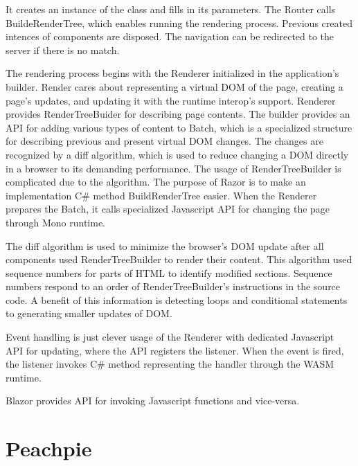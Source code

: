 It creates an instance of the class and fills in its parameters.
The Router calls BuildeRenderTree, which enables running the rendering process.
Previous created intences of components are disposed.
The navigation can be redirected to the server if there is no match.
\par
The rendering process begins with the Renderer initialized in the application's builder.
Render cares about representing a virtual DOM of the page, creating a page's updates, and updating it with the runtime interop's support.
Renderer provides RenderTreeBuider for describing page contents.
The builder provides an API for adding various types of content to Batch, which is a specialized structure for describing previous and present virtual DOM changes.
The changes are recognized by a diff algorithm, which is used to reduce changing a DOM directly in a browser to its demanding performance.
The usage of RenderTreeBuilder is complicated due to the algorithm.
The purpose of Razor is to make an implementation C\# method BuildRenderTree easier.
When the Renderer prepares the Batch, it calls specialized Javascript API for changing the page through Mono runtime.
\par
The diff algorithm is used to minimize the browser's DOM  update after all components used RenderTreeBuilder to render their content.
This algorithm used sequence numbers for parts of HTML to identify modified sections.
Sequence numbers respond to an order of RenderTreeBuilder's instructions in the source code.
A benefit of this information is detecting loops and conditional statements to generating smaller updates of DOM.  
\par
Event handling is just clever usage of the Renderer with dedicated Javascript API for updating, where the API registers the listener.
When the event is fired, the listener invokes C\# method representing the handler through the WASM runtime.
\par
Blazor provides API for invoking Javascript functions and vice-versa.

\section{Peachpie}

